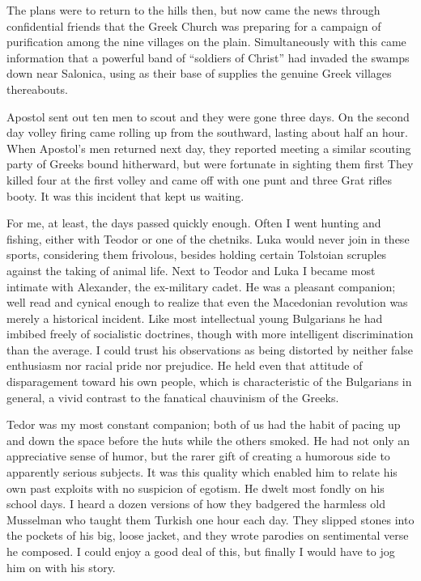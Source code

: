 \documentclass[a5paper,12pt]{book}
\begin{document}
The plans were to return to the hills then, but now came the news through confidential friends that the Greek Church was preparing for a campaign of purification among the nine villages on the plain. Simultaneously with this came information that a powerful band of “soldiers of Christ” had invaded the swamps down near Salonica, using as their base of supplies the genuine Greek villages thereabouts. 

Apostol sent out ten men to scout and they were gone three days. On the second day volley firing came rolling up from the southward, lasting about half an hour. When Apostol’s men returned next day, they reported meeting a similar scouting party of Greeks bound hitherward, but were fortunate in sighting them first They killed four at the first volley and came off with one punt and three Grat rifles booty. It was this incident that kept us waiting. 

For me, at least, the days passed quickly enough. Often I went hunting and fishing, either with Teodor or one of the chetniks. Luka would never join in these sports, considering them frivolous, besides holding certain Tolstoian scruples against the taking of animal life. Next to Teodor and Luka I became most intimate with Alexander, the ex-military cadet. He was a pleasant companion; well read and cynical enough to realize that even the Macedonian revolution was merely a historical incident. Like most intellectual young Bulgarians he had imbibed freely of socialistic doctrines, though with more intelligent discrimination than the average. I could trust his observations as being distorted by neither false enthusiasm nor racial pride nor prejudice. He held even that attitude of disparagement toward his own people, which is characteristic of the Bulgarians in general, a vivid contrast to the fanatical chauvinism of the Greeks. 

Tedor was my most constant companion; both of us had the habit of pacing up and down the space before the huts while the others smoked. He had not only an appreciative sense of humor, but the rarer gift of creating a humorous side to apparently serious subjects. It was this quality which enabled him to relate his own past exploits with no suspicion of egotism.
He dwelt most fondly on his school days. I heard a dozen versions of how they badgered the harmless old Musselman who taught them Turkish one hour each day. They slipped stones into the pockets of his big, loose jacket, and they wrote parodies on sentimental verse he composed. I could enjoy a good deal of this, but finally I would have to jog him on with his story.
\end{document}
